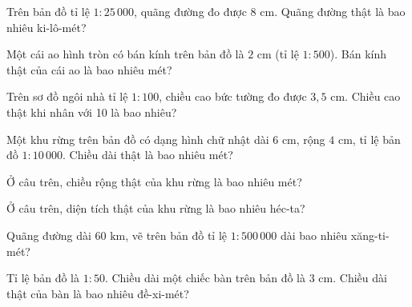 \begin{ex}
  Trên bản đồ tỉ lệ $1 : 25\,000$, quãng đường đo được $8\text{ cm}$. Quãng đường thật là bao nhiêu ki-lô-mét?
\end{ex}

\begin{ex}
  Một cái ao hình tròn có bán kính trên bản đồ là $2\text{ cm}$ (tỉ lệ $1 : 500$). Bán kính thật của cái ao là bao nhiêu mét?
\end{ex}

\begin{ex}
  Trên sơ đồ ngôi nhà tỉ lệ $1 : 100$, chiều cao bức tường đo được $3{,}5\text{ cm}$. Chiều cao thật khi nhân với 10 là bao nhiêu?
\end{ex}

\begin{ex}
  Một khu rừng trên bản đồ có dạng hình chữ nhật dài $6\text{ cm}$, rộng $4\text{ cm}$, tỉ lệ bản đồ $1 : 10\,000$. Chiều dài thật là bao nhiêu mét?
\end{ex}

\begin{ex}
  Ở câu trên, chiều rộng thật của khu rừng là bao nhiêu mét?
\end{ex}

\begin{ex}
  Ở câu trên, diện tích thật của khu rừng là bao nhiêu héc-ta?
\end{ex}

\begin{ex}
  Quãng đường dài $60\text{ km}$, vẽ trên bản đồ tỉ lệ $1 : 500\,000$ dài bao nhiêu xăng-ti-mét?
\end{ex}

\begin{ex}
  Tỉ lệ bản đồ là $1 : 50$. Chiều dài một chiếc bàn trên bản đồ là $3\text{ cm}$. Chiều dài thật của bàn là bao nhiêu đề-xi-mét?
\end{ex}

